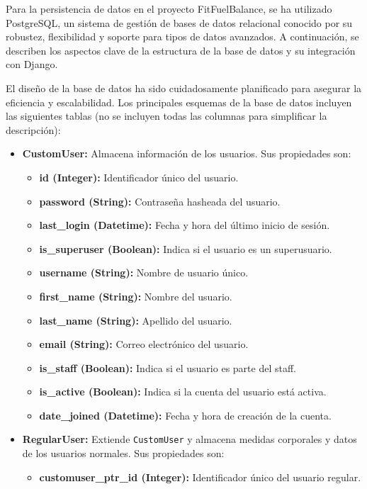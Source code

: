 Para la persistencia de datos en el proyecto FitFuelBalance, se ha utilizado PostgreSQL, un sistema de gestión de bases de datos relacional conocido por su robustez, flexibilidad y soporte para tipos de datos avanzados. A continuación, se describen los aspectos clave de la estructura de la base de datos y su integración con Django.

El diseño de la base de datos ha sido cuidadosamente planificado para asegurar la eficiencia y escalabilidad. Los principales esquemas de la base de datos incluyen las siguientes tablas (no se incluyen todas las columnas para simplificar la descripción):
\begin{itemize}
    \item \textbf{CustomUser:} Almacena información de los usuarios. Sus propiedades son:
    \begin{itemize}
        \item \textbf{id (Integer):} Identificador único del usuario.
        \item \textbf{password (String):} Contraseña hasheada del usuario.
        \item \textbf{last\_login (Datetime):} Fecha y hora del último inicio de sesión.
        \item \textbf{is\_superuser (Boolean):} Indica si el usuario es un superusuario.
        \item \textbf{username (String):} Nombre de usuario único.
        \item \textbf{first\_name (String):} Nombre del usuario.
        \item \textbf{last\_name (String):} Apellido del usuario.
        \item \textbf{email (String):} Correo electrónico del usuario.
        \item \textbf{is\_staff (Boolean):} Indica si el usuario es parte del staff.
        \item \textbf{is\_active (Boolean):} Indica si la cuenta del usuario está activa.
        \item \textbf{date\_joined (Datetime):} Fecha y hora de creación de la cuenta.
    \end{itemize}
    \item \textbf{RegularUser:} Extiende \texttt{CustomUser} y almacena medidas corporales y datos de los usuarios normales. Sus propiedades son:
    \begin{itemize}
        \item \textbf{customuser\_ptr\_id (Integer):} Identificador único del usuario regular.

\end{itemize}
\end{itemize}
